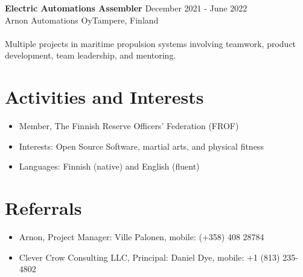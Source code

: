 \documentclass[11pt, letterpaper]{article}
\begin{document}
\textbf{Electric Automations Assembler} \hfill December 2021 - June 2022\\
Arnon Automations Oy\hfill Tampere, Finland\\
\\
Multiple projects in maritime propulsion systems involving teamwork, product development, team leadership, and mentoring.


\section*{Activities and Interests}
\begin{itemize}[leftmargin=*,noitemsep,topsep=-17pt]
	\item Member, The Finnish Reserve Officers’ Federation (FROF)
	\item Interests: Open Source Software, martial arts, and physical fitness
	\item Languages: Finnish (native) and English (fluent)
\end{itemize}

\section*{Referrals}	
\begin{itemize}[leftmargin=*,noitemsep,topsep=-17pt]
	\item Arnon, Project Manager: Ville Palonen, mobile: (+358) 408 28784
	\item Clever Crow Consulting LLC, Principal: Daniel Dye, mobile: +1 (813) 235-4802

\end{itemize}
\end{document}
